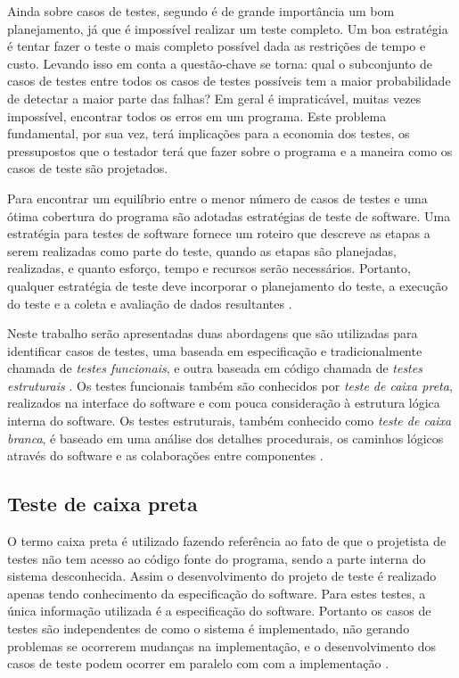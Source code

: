 Ainda sobre casos de testes, segundo \cite{myers2011art} é de grande importância um bom planejamento, já que é impossível realizar um teste completo. Um boa estratégia é tentar fazer o teste o mais completo possível dada as restrições de tempo e custo. Levando isso em conta a questão-chave se torna: qual o subconjunto de casos de testes entre todos os casos de testes possíveis tem a maior probabilidade de detectar a maior parte das falhas? Em geral é impraticável, muitas vezes impossível, encontrar todos os erros em um programa. Este problema fundamental, por sua vez, terá implicações para a economia dos testes, os pressupostos que o testador terá que fazer sobre o programa e a maneira como os casos de teste são projetados.

Para encontrar um equilíbrio entre o menor número de casos de testes e uma ótima cobertura do programa são adotadas estratégias de teste de software. Uma estratégia para testes de software fornece um roteiro que descreve as etapas a serem realizadas como parte do teste, quando as etapas são planejadas, realizadas, e quanto esforço, tempo e recursos serão necessários. Portanto, qualquer estratégia de teste deve incorporar o planejamento do teste, a execução do teste e a coleta e avaliação de dados resultantes \cite{pressman2005software}.

Neste trabalho serão apresentadas duas abordagens que são utilizadas para identificar casos de testes, uma  baseada em especificação e tradicionalmente chamada de \textit{testes funcionais}, e outra baseada em código chamada de\textit{ testes estruturais} \cite{jorgensen2016software}. Os testes funcionais também são conhecidos por \textit{teste de caixa preta}, realizados na interface do software e com pouca consideração à estrutura lógica interna do software. Os testes estruturais, também conhecido como \textit{teste de caixa branca}, é baseado em uma análise dos detalhes procedurais, os caminhos lógicos através do software e as colaborações entre componentes \cite{pressman2005software}.

\subsection{Teste de caixa preta}

O termo caixa preta é utilizado fazendo referência ao fato de que o projetista de testes não tem acesso ao código fonte do programa, sendo a parte interna do sistema desconhecida.  Assim o desenvolvimento do projeto de teste é realizado apenas tendo conhecimento da especificação do software. Para estes testes, a única informação utilizada é a especificação do software. Portanto os casos de testes são independentes de como o sistema é implementado, não gerando problemas se ocorrerem mudanças na implementação, e o desenvolvimento dos casos de teste podem ocorrer em paralelo com com a implementação \cite{jorgensen2016software}.

